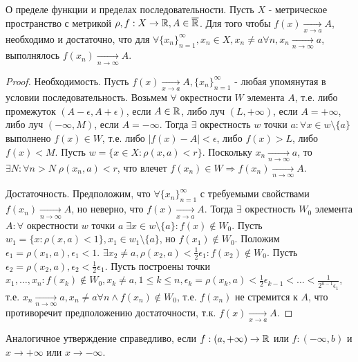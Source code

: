 \documentclass[main]{subfiles}
\begin{document}
\begin{theorem}
    О пределе функции и пределах последовательности. 
    Пусть $X$ - метрическое пространство с метрикой $\rho, f : X \to \mathbb{R},
    A \in \overline{\mathbb{R}}$. Для того чтобы $f(x) \underset{x\to a}{\to} A$, 
    необходимо и достаточно, что для $\forall \{x_n\}_{n=1}^{\infty}, x_n \in X,
    x_n \neq a \forall n, x_n \underset{n\to\infty}{\to} a$, выполнялось 
    $f(x_n) \underset{n\to\infty}{\to} A$.
\end{theorem}
\begin{proof}
    Необходимость. Пусть $f(x) \underset{x\to a}{\to} A, \{x_n\}_{n=1}^{\infty}$ -
    любая упомянутая в условии последовательность. Возьмем $\forall$ окрестности
    $W$ элемента $A$, т.е. либо промежуток $(A - \epsilon, A + \epsilon)$, если
    $A \in \mathbb{R}$, либо луч $(L, +\infty)$, если $A = +\infty$, 
    либо луч $(-\infty, M)$, если $A = -\infty$. Тогда $\exists$ окрестность
    $w$ точки $a : \forall x \in w\setminus \{a\}$ выполнено $f(x) \in W$,
    т.е. либо $|f(x) - A| < \epsilon$, либо $f(x) > L$, либо $f(x) < M$.
    Пусть $w = \{x \in X: \rho(x, a) < r\}$. Поскольку $x_n 
    \underset{n\to\infty}{\to} a$, то $\exists N : \forall n > N \; 
    \rho(x_n, a) < r$, что влечет $f(x_n) \in W \Rightarrow f(x_n) 
    \underset{n\to\infty}{\to} A$.
    
    Достаточность. Предположим, что $\forall \{x_n\}_{n=1}^{\infty}$ с 
    требуемыми свойствами $f(x_n) \underset{n\to\infty}{\to} A$, но 
    неверно, что $f(x) \underset{x\to a}{\to} A$. Тогда 
    $\exists$ окрестность $W_0$ элемента $A : \forall$ окрестности $w$ точки
    $a \; \exists x \in w \setminus \{a\} : f(x) \notin W_0$. Пусть 
    $w_1 = \{x: \rho(x, a) < 1\}, x_1 \in w_1 \setminus \{a\}$, но 
    $f(x_1) \notin W_0$. Положим $\epsilon_1 = \rho(x_1, a), \epsilon_1 < 1$.
    $\exists x_2 \neq a, \rho(x_2, a) < \frac{1}{2}\epsilon_1 : f(x_2) \notin W_0$.
    Пусть $\epsilon_2 = \rho(x_2, a), \epsilon_2 < \frac{1}{2}\epsilon_1$.
    Пусть построены точки $x_1, \ldots, x_n : f(x_k) \notin W_0, x_k \neq a, 
    1 \leq k \leq n, \epsilon_k = \rho(x_k, a) < \frac{1}{2}\epsilon_{k-1} <
    \ldots < \frac{1}{2^{n-1}\epsilon_1}$, т.е. $x_n \underset{n\to\infty}{\to} a,
    x_n \neq a \forall n \wedge f(x_n) \notin W_0$, т.е. $f(x_n)$ не стремится к 
    $A$, что противоречит предположению достаточности, т.к. $f(x) 
    \underset{x\to a}{\to} A$.
\end{proof}
\begin{addition}
    Аналогичное утверждение справедливо, если $f: (a, +\infty) \to \mathbb{R}$ или
    $f: (-\infty, b)$ и $x \to +\infty$ или $x \to -\infty$.
\end{addition}


\end{document}
